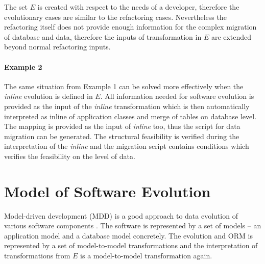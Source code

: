 \documentclass[runningheads]{comsis}
\begin{document}
The set $E$ is created with respect to the needs of a developer, therefore the evolutionary cases are similar to the refactoring cases. Nevertheless the refactoring itself does not provide enough information for the complex migration of database and data, therefore the inputs of transformation in $E$ are extended beyond normal refactoring inputs.

\paragraph{Example 2} The same situation from Example 1 can be solved more effectively when the \emph{inline} evolution is defined in $E$. All information needed for software evolution is provided as the input of the \emph{inline} transformation which is then automatically interpreted as inline of application classes and merge of tables on database level. The mapping is provided as the input of \emph{inline} too, thus the script for data migration can be generated. The structural feasibility is verified during the interpretation of the \emph{inline} and the migration script contains conditions which verifies the feasibility on the level of data.





\section{Model of Software Evolution}
\label{sec:models}
Model-driven development (MDD) is a good approach to data evolution of various software components \cite{Moravec:PracticalApproach}. The software is represented by a set of models -- an application model and a database model concretely. The evolution and ORM is represented by a set of model-to-model transformations and the interpretation of transformations from $E$ is a model-to-model transformation again. 
\end{document}
